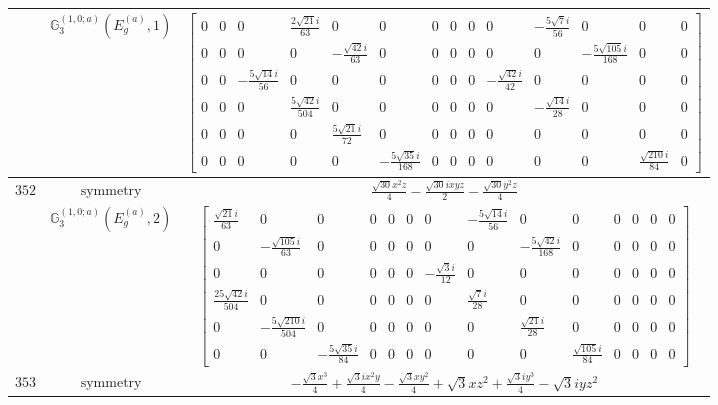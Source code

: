 \documentclass[fleqn,8pt,landscape]{jsarticle}
\begin{document}
\begin{longtable}{ccc}
$  $ & $ \mathbb{G}_{3}^{(1,0;a)}(E_{g}^{(a)},1) $ & $ \begin{bmatrix} 0 & 0 & 0 & \frac{2 \sqrt{21} i}{63} & 0 & 0 & 0 & 0 & 0 & 0 & - \frac{5 \sqrt{7} i}{56} & 0 & 0 & 0 \\ 0 & 0 & 0 & 0 & - \frac{\sqrt{42} i}{63} & 0 & 0 & 0 & 0 & 0 & 0 & - \frac{5 \sqrt{105} i}{168} & 0 & 0 \\ 0 & 0 & - \frac{5 \sqrt{14} i}{56} & 0 & 0 & 0 & 0 & 0 & 0 & - \frac{\sqrt{42} i}{42} & 0 & 0 & 0 & 0 \\ 0 & 0 & 0 & \frac{5 \sqrt{42} i}{504} & 0 & 0 & 0 & 0 & 0 & 0 & - \frac{\sqrt{14} i}{28} & 0 & 0 & 0 \\ 0 & 0 & 0 & 0 & \frac{5 \sqrt{21} i}{72} & 0 & 0 & 0 & 0 & 0 & 0 & 0 & 0 & 0 \\ 0 & 0 & 0 & 0 & 0 & - \frac{5 \sqrt{35} i}{168} & 0 & 0 & 0 & 0 & 0 & 0 & \frac{\sqrt{210} i}{84} & 0 \end{bmatrix} $ \\ \hline
$ 352 $ & $ \text{symmetry} $ & $ \frac{\sqrt{30} x^{2} z}{4} - \frac{\sqrt{30} i x y z}{2} - \frac{\sqrt{30} y^{2} z}{4} $ \\
$  $ & $ \mathbb{G}_{3}^{(1,0;a)}(E_{g}^{(a)},2) $ & $ \begin{bmatrix} \frac{\sqrt{21} i}{63} & 0 & 0 & 0 & 0 & 0 & 0 & - \frac{5 \sqrt{14} i}{56} & 0 & 0 & 0 & 0 & 0 & 0 \\ 0 & - \frac{\sqrt{105} i}{63} & 0 & 0 & 0 & 0 & 0 & 0 & - \frac{5 \sqrt{42} i}{168} & 0 & 0 & 0 & 0 & 0 \\ 0 & 0 & 0 & 0 & 0 & 0 & - \frac{\sqrt{3} i}{12} & 0 & 0 & 0 & 0 & 0 & 0 & 0 \\ \frac{25 \sqrt{42} i}{504} & 0 & 0 & 0 & 0 & 0 & 0 & \frac{\sqrt{7} i}{28} & 0 & 0 & 0 & 0 & 0 & 0 \\ 0 & - \frac{5 \sqrt{210} i}{504} & 0 & 0 & 0 & 0 & 0 & 0 & \frac{\sqrt{21} i}{28} & 0 & 0 & 0 & 0 & 0 \\ 0 & 0 & - \frac{5 \sqrt{35} i}{84} & 0 & 0 & 0 & 0 & 0 & 0 & \frac{\sqrt{105} i}{84} & 0 & 0 & 0 & 0 \end{bmatrix} $ \\ \hline
$ 353 $ & $ \text{symmetry} $ & $ - \frac{\sqrt{3} x^{3}}{4} + \frac{\sqrt{3} i x^{2} y}{4} - \frac{\sqrt{3} x y^{2}}{4} + \sqrt{3} x z^{2} + \frac{\sqrt{3} i y^{3}}{4} - \sqrt{3} i y z^{2} $ \\

\end{longtable}
\end{document}
